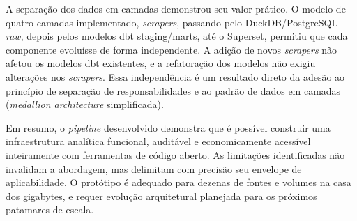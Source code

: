 A separação dos dados em camadas demonstrou seu valor prático. O modelo de quatro camadas
implementado, \textit{scrapers}, passando pelo DuckDB/PostgreSQL \textit{raw},
depois pelos modelos dbt staging/marts, até o Superset, permitiu que cada componente
evoluísse de forma independente. A adição de novos \textit{scrapers} não afetou os
modelos dbt existentes, e a refatoração dos modelos não exigiu alterações nos
\textit{scrapers}. Essa independência é um resultado direto da adesão ao princípio de
separação de responsabilidades e ao padrão de dados em camadas (\textit{medallion
architecture} simplificada).

Em resumo, o \textit{pipeline} desenvolvido demonstra que é possível construir uma
infraestrutura analítica funcional, auditável e economicamente acessível inteiramente
com ferramentas de código aberto. As limitações
identificadas não invalidam a abordagem, mas delimitam com precisão seu envelope de
aplicabilidade. O protótipo é adequado para dezenas de fontes e volumes na casa dos
gigabytes, e requer evolução arquitetural planejada para os próximos patamares de escala.


